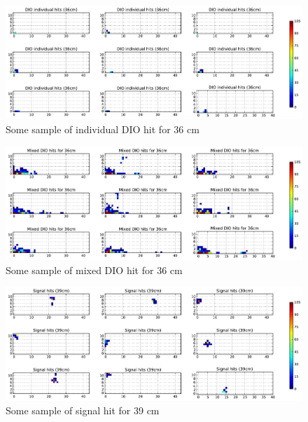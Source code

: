\documentclass[11pt]{article}
\begin{document}
\begin{figure}[htbp]
   \centering
   \includegraphics[width=\textwidth]{../plot/dio_sample_hit_36.pdf} %
   \caption{Some sample of individual DIO hit for 36 cm}
   \label{fig:dio_sample_hit_36}
\end{figure}

\begin{figure}[htbp]
   \centering
   \includegraphics[width=\textwidth]{../plot/mixed_dio_sample_hit_36.pdf} %
   \caption{Some sample of mixed DIO hit for 36 cm}
   \label{fig:mixed_dio_sample_hit_36}
\end{figure}

\begin{figure}[htbp]
   \centering
   \includegraphics[width=\textwidth]{../plot/sig_sample_hit_39.pdf} %
   \caption{Some sample of signal hit for 39 cm}
   \label{fig:sig_sample_hit_39}
\end{figure}
\end{document}

